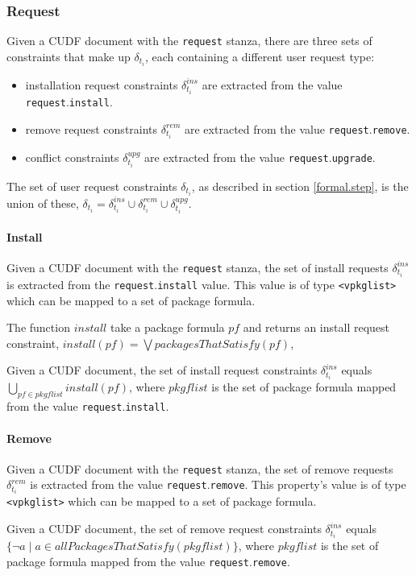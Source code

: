 \subsubsection{Request}
\label{formal.cudf.request}
Given a CUDF document with the \texttt{request} stanza, there are three sets of constraints that make up $\delta_{t_i}$, each containing a different user request type:
\begin{itemize}
  \item installation request constraints $\delta_{t_i}^{ins}$ are extracted from the value \texttt{request}.\texttt{install}.
  \item remove request constraints  $\delta_{t_i}^{rem}$ are extracted from the value \texttt{request}.\texttt{remove}.
  \item conflict  constraints $\delta_{t_i}^{upg}$ are extracted from the value \texttt{request}.\texttt{upgrade}.
\end{itemize}
The set of user request constraints $\delta_{t_i}$, as described in section \ref{formal.step}, is the union of these,
$\delta_{t_i} =  \delta_{t_i}^{ins} \cup \delta_{t_i}^{rem} \cup \delta_{t_i}^{upg}$.

\paragraph{Install}
Given a CUDF document with the \texttt{request} stanza, the set of install requests $\delta_{t_i}^{ins}$ is extracted from the \texttt{request}.\texttt{install} value.
This value is of type \texttt{<vpkglist>} which can be mapped to a set of package formula.
\begin{defs}
The function  $install$ take a package formula $pf$ and returns an install request constraint, $install(pf) = \bigvee packagesThatSatisfy(pf)$, 
\end{defs}

\begin{defs}
Given a CUDF document, the set of install request constraints $\delta_{t_i}^{ins}$  equals
$\bigcup \limits_{pf \in pkgflist} install(pf)$, 
where $pkgflist$ is the set of package formula mapped from the value \texttt{request}.\texttt{install}.
\end{defs}

\paragraph{Remove}
Given a CUDF document with the \texttt{request} stanza, the set of remove requests $\delta_{t_i}^{rem}$ is extracted from the value \texttt{request}.\texttt{remove}.
This property's value is of type \texttt{<vpkglist>} which can be mapped to a set of package formula.
\begin{defs}
Given a CUDF document, the set of remove request constraints $\delta_{t_i}^{ins}$ equals $\{ \neg a \mid a \in allPackagesThatSatisfy(pkgflist)\}$, 
where $pkgflist$ is the set of package formula mapped from the value \texttt{request}.\texttt{remove}.
\end{defs}


